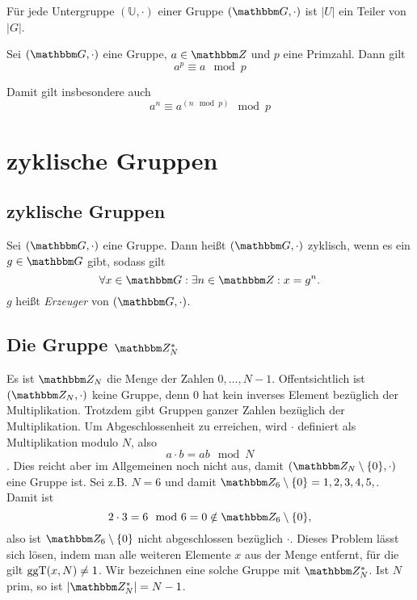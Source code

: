  \begin{theorem}
   Für jede Untergruppe $(\mathbb{U}, \cdot)$ einer Gruppe $(\G, \cdot)$
   ist $|U|$ ein Teiler von $|G|$.   
 \end{theorem}

 \begin{theorem}
   Sei $(\G, \cdot)$ eine Gruppe, $a \in \Z{}$ und $p$ eine
   Primzahl. Dann gilt
   \[a^p \equiv a \mod p\]
 \end{theorem}
Damit gilt insbesondere auch
\[a^n \equiv a^{(n \mod p)} \mod p\]
\section{zyklische Gruppen}

\subsection{zyklische Gruppen}
\begin{definition}
  Sei $(\G, \cdot)$ eine Gruppe. Dann heißt $(\G, \cdot)$ zyklisch, wenn
  es ein $g \in \G$ gibt, sodass gilt
\[
  \forall x \in \G: \exists n \in \Z{}: x=g^n.
\]
$g$ heißt \textit{Erzeuger} von $(\G, \cdot)$.
\end{definition}

\subsection{Die Gruppe $\Z{N}^*$}
Es ist $\Z{N}$ die Menge der Zahlen ${0,\dots , N-1}$. Offentsichtlich
ist $(\Z{N}, \cdot)$ keine Gruppe, denn $0$ hat kein inverses Element
bezüglich der Multiplikation.
Trotzdem gibt Gruppen ganzer Zahlen bezüglich der
Multiplikation. Um Abgeschlossenheit zu erreichen, wird $\cdot$
definiert als Multiplikation modulo $N$, also 
\[a \cdot b = ab \mod N\]. Dies reicht aber im Allgemeinen noch nicht
aus, damit $(\Z{N}\setminus \{0\}, \cdot)$ eine Gruppe ist. Sei z.B. $N=6$ und
damit $\Z{6}\setminus \{0\} = {1,2,3,4,5,}$. Damit ist 
\[
2 \cdot 3 = 6 \mod 6 = 0 \notin \Z{6}\setminus \{0\},
\]
also ist $\Z{6}\setminus \{0\}$ nicht abgeschlossen bezüglich $\cdot$. 
Dieses Problem lässt sich lösen, indem man alle weiteren Elemente $x$ aus
der Menge entfernt, für die gilt $\operatorname{ggT}(x, N)\neq 1$. Wir bezeichnen eine
solche Gruppe mit $\Z{N}^*$. Ist $N$ prim, so ist $|\Z{N}^*| = N-1$.